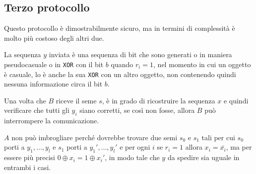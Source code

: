\subsection{Terzo protocollo}
Questo protocollo è dimostrabilmente sicuro, ma in termini di complessità è molto più
costoso degli altri due.
  
La sequenza $y$ inviata è una sequenza di bit che sono generati o in maniera pseudocasuale 
o in \texttt{XOR} con il bit $b$ quando $r_i = 1$, nel momento in cui un oggetto è casuale,
lo è anche la sua \texttt{XOR} con un altro oggetto, non contenendo quindi nessuna 
informazione circa il bit $b$.

Una volta che $B$ riceve il seme $s$, è in grado di ricostruire la sequenza $x$ e quindi
verificare che tutti gli $y_i$ siano corretti, se così non fosse, allora $B$ può
interrompere la comunicazione.

$A$ non può imbrogliare perché dovrebbe trovare due semi $s_0$ e $s_1$ tali
per cui $s_0$ porti a $y_1,\dots,y_l$ e $s_1$ porti a
$y_1',\dots,y_l'$ e per ogni $i$ se $r_i = 1$ allora $x_i = \bar{x_i}$, ma per essere più precisi 
$0 \oplus x_i = 1 \oplus x_i'$, in modo tale che $y$ da spedire sia uguale in entrambi i casi.

